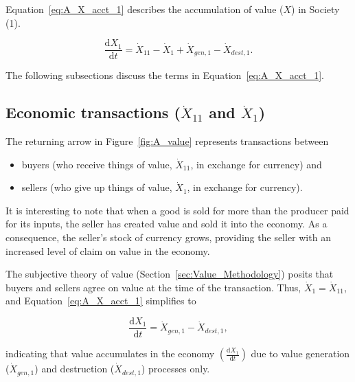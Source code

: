 Equation~\ref{eq:A_X_acct_1} describes the accumulation 
of value
($X$) in Society (1).

\begin{equation} \label{eq:A_X_acct_1}
	\frac{\mathrm{d}X_{1}}{\mathrm{d}t} 
	= \dot{X}_{11} 
	- \dot{X}_{1}
	+ \dot{X}_{gen,1}
	- \dot{X}_{dest,1}.
\end{equation}

\noindent{} The following subsections discuss the terms in Equation~\ref{eq:A_X_acct_1}.


\subsection{Economic transactions ($\dot{X}_{11}$ and $\dot{X}_{1}$)}

The returning arrow in Figure~\ref{fig:A_value} 
represents transactions between 
\begin{itemize}
	\item{buyers (who receive things of value, $\dot{X}_{11}$,
	in exchange for currency) and}
	\item{sellers (who give up things of value, $\dot{X}_{1}$,
	in exchange for currency).}
\end{itemize}

It is interesting to note that when a good is sold for more
than the producer paid for its inputs, 
the seller has created value and sold it into the economy. 
As a consequence, the seller's stock of currency grows,
providing the seller with an increased level of claim 
on value in the economy.

The subjective theory of value
(Section~\ref{sec:Value_Methodology})
posits that buyers and sellers agree on value at the 
time of the transaction.
Thus, $\dot{X}_{1} = \dot{X}_{11}$, and Equation~\ref{eq:A_X_acct_1}
simplifies to

\begin{equation} \label{eq:A_X_acct_2}	
	\frac{\mathrm{d}X_{1}}{\mathrm{d}t}	
	= \dot{X}_{gen,1}
	- \dot{X}_{dest,1},
\end{equation}

\noindent{}indicating that value accumulates in the economy
$\left( \frac{\mathrm{d}X_{1}}{\mathrm{d}t} \right)$
due to value generation ($\dot{X}_{gen,1}$) 
and destruction ($\dot{X}_{dest,1}$) processes only.


